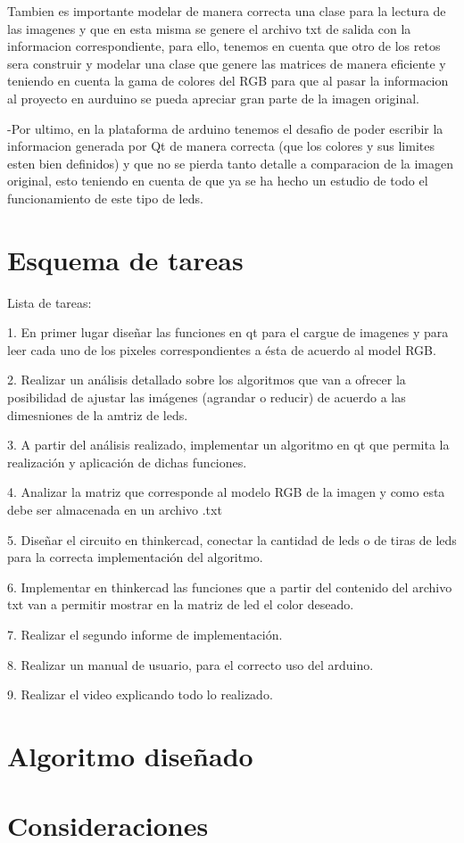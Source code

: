 \documentclass{article}
\begin{document}
Tambien es importante modelar de manera correcta una clase para la lectura de las imagenes y que en esta misma se genere el archivo txt de salida con la informacion correspondiente, para ello, tenemos en cuenta que otro de los retos sera construir y modelar una clase que genere las matrices de manera eficiente y teniendo en cuenta la gama de colores del RGB para que al pasar la informacion al proyecto en aurduino se pueda apreciar gran parte de la imagen original.

-Por ultimo, en la plataforma de arduino tenemos el desafio de poder escribir la informacion generada por Qt de manera correcta (que los colores y sus limites esten bien definidos) y que no se pierda tanto detalle a comparacion de la imagen original, esto teniendo en cuenta de que ya se ha hecho un estudio de todo el funcionamiento de este tipo de leds.


\section{Esquema de tareas} \label{Esquema}

Lista de tareas:

1. En primer lugar diseñar las funciones en qt para el cargue de imagenes y para leer cada uno de los pixeles correspondientes a ésta de acuerdo al model RGB.

2. Realizar un análisis detallado sobre los algoritmos que van a ofrecer la posibilidad de ajustar las imágenes (agrandar o reducir) de acuerdo a las dimesniones de la amtriz de leds.

3. A partir del análisis realizado, implementar un algoritmo en qt que permita la realización y aplicación de dichas funciones.

4. Analizar la matriz que corresponde al modelo RGB de la imagen y como esta debe ser almacenada en un archivo .txt

5. Diseñar el circuito en thinkercad, conectar la cantidad de leds o de tiras de leds para la correcta implementación del algoritmo.

6. Implementar en thinkercad las funciones que a partir del contenido del archivo txt van a permitir mostrar en la matriz de led el color deseado.

7. Realizar el segundo informe de implementación.

8. Realizar un manual de usuario, para el correcto uso del arduino.

9. Realizar el video explicando todo lo realizado.


\section{Algoritmo diseñado}\label{Algoritmo}



\section{Consideraciones}\label{Consideraciones}
\end{document}
